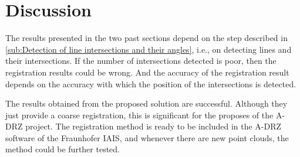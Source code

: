     \section{Discussion}
        The results presented in the two past sections depend on the step described in 
        \autoref{sub:Detection of line intersections and their angles}, i.e., on detecting lines and their intersections.
        If the number of intersections detected is poor, then the registration results could be wrong.
        And the accuracy of the registration result depends on the accuracy with which the position of the intersections is detected.
        
        The results obtained from the proposed solution are successful. 
        Although they just provide a coarse registration, this is significant for the proposes of the A-DRZ project.
        The registration method is ready to be included in the A-DRZ software of the Fraunhofer IAIS,
        and whenever there are new point clouds, the method could be further tested.
    

